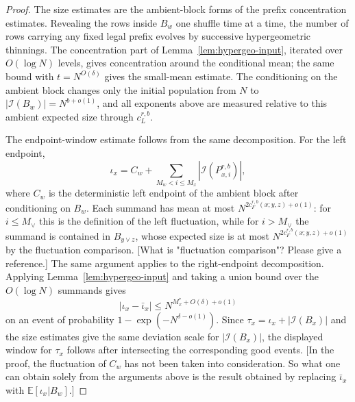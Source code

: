 \documentclass[11pt]{article}
\newcommand{\cI}{\mathcal I}
\newcommand{\E}{\mathbb E}
\newcommand{\jscomment}[1]{\textup{\textsf{\color{blue}[#1]}}}
\begin{document}
\begin{proof}
The size estimates are the ambient-block forms of the prefix
concentration estimates. Revealing the rows inside \(B_w\) one shuffle
time at a time, the number of rows carrying any fixed legal prefix evolves
by successive hypergeometric thinnings. The concentration part of
Lemma~\ref{lem:hypergeo-input}, iterated over \(O(\log N)\) levels, gives
concentration around the conditional mean; the same bound with
\(t=N^{O(\delta)}\) gives the small-mean estimate. The conditioning on
the ambient block changes only the initial population from \(N\) to
\(|\cI(B_w)|=N^{b+o(1)}\), and all exponents above are measured relative
to this ambient expected size through \(c_L^{r,b}\).

The endpoint-window estimate follows from the same decomposition. For
the left endpoint,
\[
    \iota_x=
    C_w+\sum_{M_w<i\le M_x}|\cI(P_{x,i}^{r,b})|,
\]
where \(C_w\) is the deterministic left endpoint of the ambient block
after conditioning on \(B_w\). Each summand has mean at most
\(N^{2c_F^{r,b}(x;y,z)+o(1)}\): for \(i\le M_\vee\) this is the
definition of the left fluctuation, while for \(i>M_\vee\) the summand is
contained in \(B_{y\vee z}\), whose expected size is at most
\(N^{2c_F^{r,b}(x;y,z)+o(1)}\) by the fluctuation comparison. \jscomment{What is "fluctuation comparison"? Please give a reference.}
The same
argument applies to the right-endpoint decomposition.
Applying Lemma~\ref{lem:hypergeo-input} and taking a union bound over the
\(O(\log N)\) summands gives
\[
    |\iota_x-\bar\iota_x|
    \le N^{M_x^*+O(\delta)+o(1)}
\]
on an event of probability \(1-\exp(-N^{\delta-o(1)})\). Since
\(\tau_x=\iota_x+|\cI(B_x)|\) and the size estimates give the same
deviation scale for \(|\cI(B_x)|\), the displayed window for \(\tau_x\)
follows after intersecting the corresponding good events.
\jscomment{In the proof, the fluctuation of $C_{w}$ has not been taken into consideration. So what one can obtain solely from the arguments above is the result obtained by replacing $\bar \iota_x$ with $\E[\iota_x|B_w]$.}


\end{proof}
\end{document}

